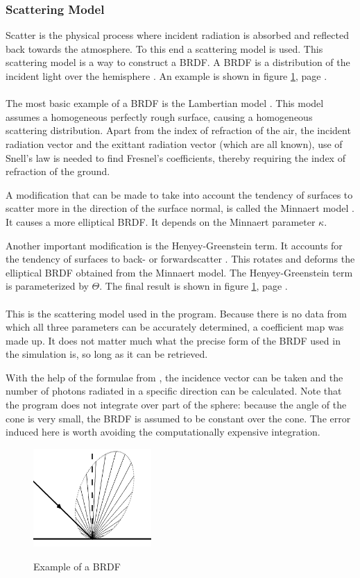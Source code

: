 \subsubsection{Scattering Model}
\label{scatter}
Scatter is the physical process where incident radiation is absorbed and reflected back towards the atmosphere. To this end a scattering model is used. This scattering model is a way to construct a \ac{BRDF}. A \ac{BRDF} is a distribution of the incident light over the hemisphere \cite[pages 47-49]{rees}. An example is shown in figure \ref{fig:scatter}, page \pageref{fig:scatter}.\\\\
The most basic example of a \ac{BRDF} is the Lambertian model \cite[pages 49-50]{rees}. This model assumes a homogeneous perfectly rough surface, causing a homogeneous scattering distribution. Apart from the index of refraction of the air, the incident radiation vector and the exittant radiation vector (which are all known), use of Snell's law is needed to find Fresnel's coefficients, thereby requiring the index of refraction of the ground.

A modification that can be made to take into account the tendency of surfaces to scatter more in the direction of the surface normal, is called the Minnaert model \cite[page 50]{rees}. It causes a more elliptical \ac{BRDF}. It depends on the Minnaert parameter $\kappa$.

Another important modification is the Henyey-Greenstein term. It accounts for the tendency of surfaces to back- or forwardscatter \cite[page 51]{rees}. This rotates and deforms the elliptical \ac{BRDF} obtained from the Minnaert model. The Henyey-Greenstein term is parameterized by $\Theta$. The final result is shown in figure \ref{fig:scatter}, page \pageref{fig:scatter}.\\\\
This is the scattering model used in the program. Because there is no data from which all three parameters can be accurately determined, a coefficient map was made up. It does not matter much what the precise form of the \ac{BRDF} used in the simulation is, so long as it can be retrieved.

With the help of the formulae from \cite[pages 43-51]{rees}, the incidence vector can be taken and the number of photons radiated in a specific direction can be calculated. Note that the program does not integrate over part of the sphere: because the angle of the cone is very small, the \ac{BRDF} is assumed to be constant over the cone. The error induced here is worth avoiding the computationally expensive integration.


\begin{figure}[ht!]
\centering
\includegraphics[width=0.4\textwidth]{chapters/img/scatter.png}
\label{fig:scatter}
\caption{Example of a \ac{BRDF}}
\end{figure}